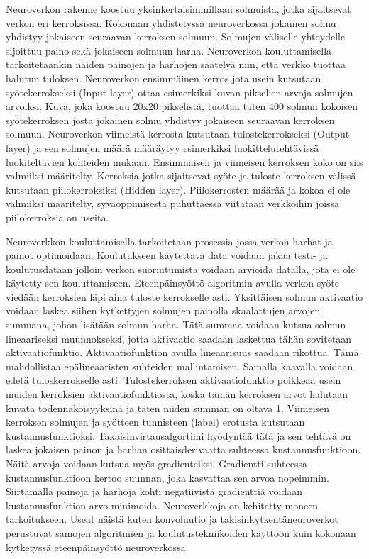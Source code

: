 Neuroverkon rakenne koostuu yksinkertaisimmillaan solmuista, jotka sijaitsevat verkon eri kerroksissa. Kokonaan yhdistetyssä neuroverkossa jokainen solmu yhdistyy jokaiseen seuraavan kerroksen solmuun. Solmujen väliselle yhteydelle sijoittuu paino sekä jokaiseen solmuun harha. Neuroverkon kouluttamisella tarkoitetaankin näiden painojen ja harhojen säätelyä niin, että verkko tuottaa halutun tuloksen. Neuroverkon ensimmäinen kerros jota usein kutsutaan syötekerrokseksi (Input layer) ottaa esimerkiksi kuvan pikselien arvoja solmujen arvoiksi. Kuva, joka koostuu 20x20 pikselistä, tuottaa täten 400 solmun kokoisen syötekerroksen josta jokainen solmu yhdistyy jokaiseen seuraavan kerroksen solmuun. Neuroverkon viimeistä kerrosta kutsutaan tulostekerrokseksi (Output layer) ja sen solmujen määrä määräytyy esimerkiksi luokittelutehtävissä luokiteltavien kohteiden mukaan. Ensimmäisen ja viimeisen kerroksen koko on siis valmiiksi määritelty. Kerroksia jotka sijaitsevat syöte ja tuloste kerroksen välissä kutsutaan piilokerroksiksi (Hidden layer). Piilokerrosten määrää ja kokoa ei ole valmiiksi määritelty, syväoppimisesta puhuttaessa viitataan verkkoihin joissa piilokerroksia on useita. 

Neuroverkkon kouluttamisella tarkoitetaan prosessia jossa verkon harhat ja painot optimoidaan. Koulutukseen käytettävä data voidaan jakaa testi- ja koulutusdataan jolloin verkon suoriutumista voidaan arvioida datalla, jota ei ole käytetty sen kouluttamiseen. Eteenpäinsyöttö algoritmin avulla verkon syöte viedään kerroksien läpi aina tuloste kerrokselle asti. Yksittäisen solmun aktivaatio voidaan laskea siihen kytkettyjen solmujen painolla skaalattujen arvojen summana, johon lisätään solmun harha. Tätä summaa voidaan kutsua solmun lineaariseksi muunnokseksi, jotta aktivaatio saadaan laskettua tähän sovitetaan aktivaatiofunktio. Aktivaatiofunktion avulla lineaarisuus saadaan rikottua. Tämä mahdollistaa epälineaaristen suhteiden mallintamisen. Samalla kaavalla voidaan edetä tuloskerrokselle asti. Tulostekerroksen aktivaatiofunktio poikkeaa usein muiden kerroksien aktivaatiofunktiosta, koska tämän kerroksen arvot halutaan kuvata todennäköisyyksinä ja täten niiden summan on oltava 1. Viimeisen kerroksen solmujen ja syötteen tunnisteen (label) erotusta kutsutaan kustannusfunktioksi. Takaisinvirtausalgortimi hyödyntää tätä ja sen tehtävä on laskea jokaisen painon ja harhan osittaisderivaatta suhteessa kustannusfunktioon. Näitä arvoja voidaan kutsua myös gradienteiksi. Gradientti suhteessa kustannusfunktioon kertoo suunnan, joka kasvattaa sen arvoa nopeimmin. Siirtämällä painoja ja harhoja kohti negatiivistä gradienttiä voidaan kustannusfunktion arvo minimoida. Neuroverkkoja on kehitetty moneen tarkoitukseen. Useat näistä kuten konvoluutio ja takisinkytkentäneuroverkot perustuvat samojen algoritmien ja koulutustekniikoiden käyttöön kuin kokonaan kytketyssä eteenpäinsyöttö neuroverkossa. 

